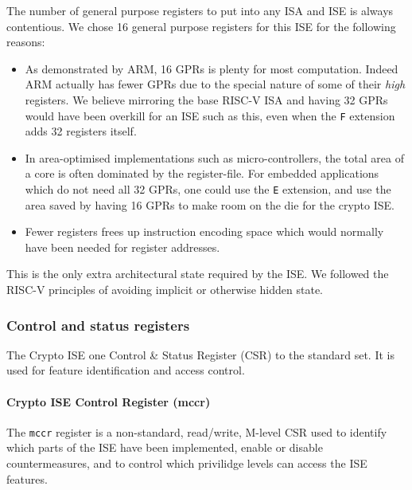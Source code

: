
The number of general purpose registers to put into any ISA and ISE is
always contentious.
We chose 16 general purpose registers for this ISE for the following reasons:

\begin{itemize}
\item As demonstrated by ARM, 16 GPRs is plenty for most computation.
Indeed ARM actually has fewer GPRs due to the special nature of some of their
{\em high} registers.
We believe mirroring the base RISC-V ISA and having
32 GPRs would have been overkill for an ISE such as this, even when the
{\tt F} extension adds 32 registers itself.
\item In area-optimised implementations such as micro-controllers, the
total area of a core is often dominated by the register-file.
For embedded applications which do not need all 32 GPRs, one could use the 
{\tt E} extension, and use the area saved by having 16 GPRs to make room
on the die for the crypto ISE.
\item Fewer registers frees up instruction encoding space which would
normally have been needed for register addresses.
\end{itemize}

This is the only extra architectural state required by the ISE.
We followed the RISC-V principles of avoiding implicit or otherwise
hidden state.


\subsubsection{Control and status registers}
\label{sec:spec:state:csr}

The Crypto ISE one Control \& Status Register (CSR) to the
standard set. It is used for feature identification and access
control.

\paragraph{Crypto ISE Control Register (mccr)}

The {\tt mccr} register is a non-standard, read/write, M-level CSR
used to identify which parts of the ISE have been implemented,
enable or disable countermeasures, and to control which privilidge
levels can access the ISE features.

